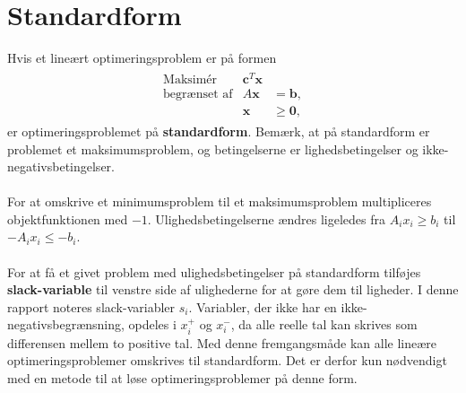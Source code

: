 \section{Standardform}
% 
Hvis et lineært optimeringsproblem er på formen
%
\begin{align*}
\begin{array}{lrl}
\text{Maksimér}		&\textbf{c}^T\textbf{x}	&				\\
\text{begrænset af}	&A\textbf{x}	&=\mathbf{b},	\\
					&\mathbf{x}				&\geq \mathbf{0},
\end{array}
\end{align*}
%
er optimeringsproblemet på \textbf{standardform}.
Bemærk, at på standardform er problemet et maksimumsproblem, og betingelserne er lighedsbetingelser og ikke-negativsbetingelser.
\\\\
%
For at omskrive et minimumsproblem til et maksimumsproblem multipliceres objektfunktionen med $-1$.
Ulighedsbetingelserne ændres ligeledes fra $A_ix_i \geq b_i$ til $-A_ix_i \leq -b_i$.
\\\\
For at få et givet problem med ulighedsbetingelser på standardform tilføjes \textbf{slack-variable} til venstre side af ulighederne for at gøre dem til ligheder.
I denne rapport noteres slack-variabler $s_i$.
Variabler, der ikke har en ikke-negativsbegrænsning, opdeles i $x_i^+$ og $x_i^-$, da alle reelle tal kan skrives som differensen mellem to positive tal.
Med denne fremgangsmåde kan alle lineære optimeringsproblemer omskrives til standardform.
Det er derfor kun nødvendigt med en metode til at løse optimeringsproblemer på denne form.
%

